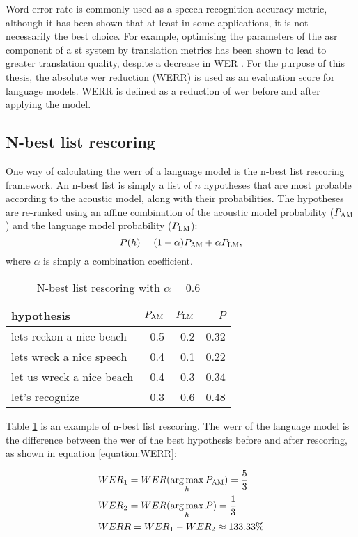 Word error rate is commonly used as a speech recognition accuracy metric, although it has been shown that at least in some applications, it is not necessarily the best choice. For example, optimising the parameters of the \gls{asr} component of a \gls{st} system by translation metrics has been shown to lead to greater translation quality, despite a decrease in WER \cite{he2011word}. For the purpose of this thesis, the absolute \gls{wer} reduction (WERR) is used as an evaluation score for language models. WERR is defined as a reduction of \gls{wer} before and after applying the model.
	\subsection{N-best list rescoring}
	One way of calculating the \gls{werr} of a language model is the n-best list rescoring framework. An n-best list is simply a list of $n$ hypotheses that are most probable according to the acoustic model, along with their probabilities. The hypotheses are re-ranked using an affine combination of the acoustic model probability ($P_{\textsc{AM}}$) and the language model probability ($P_{\textsc{LM}}$):
	\begin{equation*}
		P(h)=(1-\alpha) P_{\textsc{AM}}+\alpha P_{\textsc{LM}},
	\end{equation*}
	where $\alpha$ is simply a combination coefficient.

\begin{table}[h!]
  \caption{N-best list rescoring with $\alpha=0.6$}
  \label{table:nbest}
    \centering
    \begin{tabular*}{.6\linewidth}{@{\extracolsep{\fill}}lrrr}
	    hypothesis & $P_{\textsc{AM}}$ & $P_{\textsc{LM}}$ & $ P $\\
	        \midrule
		lets reckon a nice beach    & 0.5 & 0.2 & 0.32\\
		lets wreck a nice speech    & 0.4 & 0.1 & 0.22\\
		let us wreck a nice beach   & 0.4 & 0.3 & 0.34\\
		let's recognize             & 0.3 & 0.6 & 0.48\\
    \end{tabular*}
\end{table}
Table \ref{table:nbest} is an example of n-best list rescoring. The \gls{werr} of the language model is the difference between the \gls{wer} of the best hypothesis before and after rescoring, as shown in equation \ref{equation:WERR}:

	\begin{align}
		\label{equation:WERR}
		&WER_{1}=WER(\operatorname*{arg\, max}_{h}{P_{\textsc{AM}}})=\frac{5}{3} \nonumber\\
		&WER_{2}=WER(\operatorname*{arg\, max}_{h}{P})=\frac{1}{3} \nonumber\\
		&WERR =  WER_{1} - WER_{2}\approx133.33\%
	\end{align}
